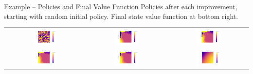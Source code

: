 \documentclass[ignorenonframetext,xcolor=x11names]{beamer}
\begin{document}
\begin{frame}{Example -- Policies and Final Value Function}
Policies after each improvement, starting with random initial policy. Final state value function at bottom right. \\

\vspace{.5\baselineskip}
\begin{tabular}{ccc}
\includegraphics[width=0.3\textwidth]{rl_into/jacks_init_random/jacks_pi_iteration_0.png} &
\includegraphics[width=0.3\textwidth]{rl_into/jacks_init_random/jacks_pi_iteration_1.png} &
\includegraphics[width=0.3\textwidth]{rl_into/jacks_init_random/jacks_pi_iteration_2.png} \\
\includegraphics[width=0.3\textwidth]{rl_into/jacks_init_random/jacks_pi_iteration_3.png} &
\includegraphics[width=0.3\textwidth]{rl_into/jacks_init_random/jacks_pi_iteration_4.png} &
\includegraphics[width=0.3\textwidth]{rl_into/jacks_init_random/jacks_V_iteration_4.png}
\end{tabular}
\end{frame}
\end{document}
